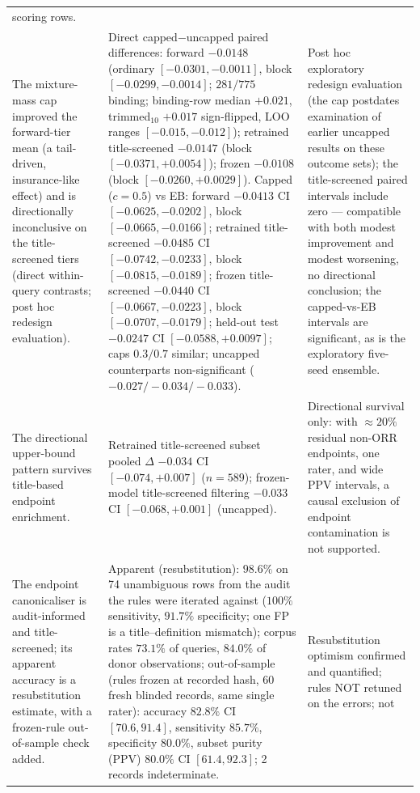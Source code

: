 \documentclass[11pt]{article}
\begin{document}
\begin{longtable}{p{} p{} p{}}
scoring rows. \\
The mixture-mass cap improved the forward-tier mean (a tail-driven,
insurance-like effect) and is directionally inconclusive on the
title-screened tiers (direct
within-query contrasts; post hoc
redesign evaluation). & Direct capped$-$uncapped paired differences:
forward $-0.0148$ (ordinary $[-0.0301,-0.0011]$, block
$[-0.0299,-0.0014]$; $281/775$ binding; binding-row median $+0.021$,
trimmed$_{10}$ $+0.017$ sign-flipped, LOO ranges $[-0.015,-0.012]$);
retrained title-screened
$-0.0147$ (block $[-0.0371,+0.0054]$); frozen $-0.0108$ (block
$[-0.0260,+0.0029]$). Capped
($c=0.5$) vs EB: forward $-0.0413$ CI $[-0.0625,-0.0202]$, block
$[-0.0665,-0.0166]$; retrained
title-screened $-0.0485$ CI $[-0.0742,-0.0233]$, block
$[-0.0815,-0.0189]$; frozen title-screened
$-0.0440$ CI $[-0.0667,-0.0223]$, block $[-0.0707,-0.0179]$; held-out
test $-0.0247$ CI
$[-0.0588,+0.0097]$; caps $0.3/0.7$ similar; uncapped counterparts
non-significant ($-0.027/-0.034/-0.033$). & Post hoc exploratory redesign
evaluation (the cap postdates examination of earlier uncapped results on
these outcome sets); the title-screened paired intervals include zero
--- compatible with both modest improvement and modest worsening, no
directional conclusion; the capped-vs-EB
intervals are significant, as is the exploratory five-seed ensemble. \\
The directional upper-bound pattern survives title-based endpoint
enrichment. &
Retrained title-screened subset pooled $\Delta$ $-0.034$ CI
$[-0.074,+0.007]$ ($n=589$); frozen-model title-screened filtering
$-0.033$ CI $[-0.068,+0.001]$ (uncapped). & Directional survival only:
with $\approx 20\%$ residual non-ORR endpoints, one rater, and wide PPV
intervals, a causal exclusion of endpoint contamination is not
supported. \\
The endpoint canonicaliser is audit-informed and title-screened; its
apparent accuracy is a resubstitution estimate, with a frozen-rule
out-of-sample check added. & Apparent (resubstitution): $98.6\%$ on 74
unambiguous rows from the audit the rules were iterated against ($100\%$
sensitivity, $91.7\%$ specificity; one FP is a title--definition
mismatch); corpus rates $73.1\%$ of queries, $84.0\%$ of donor
observations; out-of-sample (rules frozen at recorded hash, 60 fresh
blinded records, same single rater): accuracy $82.8\%$ CI $[70.6,91.4]$,
sensitivity $85.7\%$, specificity $80.0\%$, subset purity (PPV) $80.0\%$
CI $[61.4,92.3]$; 2 records indeterminate. & Resubstitution optimism
confirmed and quantified; rules NOT retuned on the errors; not

\end{longtable}
\end{document}
